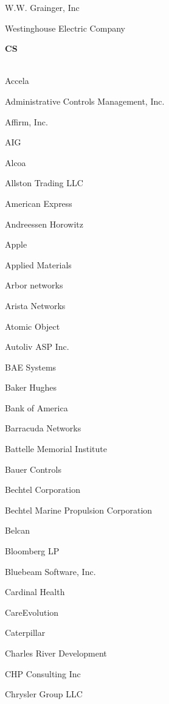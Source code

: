 \documentclass[twoside]{article}
\begin{document}
\begin{center}
\begin{multicols}{5}
\begin{FlushLeft}
\begin{compactitem}
\item W.W. Grainger, Inc
\item Westinghouse Electric Company
\end{compactitem}
        \end{FlushLeft}
        \vspace{1em}
        {\fontsize{14}{16}\selectfont \bf CS}\\
        \vspace{-1em}
        ~\hrulefill~
        \vspace{-.9em}
        \begin{FlushLeft}
        \begin{compactitem}
        \item Accela
\item Administrative Controls Management, Inc.
\item Affirm, Inc.
\item AIG
\item Alcoa
\item Allston Trading LLC
\item American Express
\item Andreessen Horowitz
\item Apple
\item Applied Materials
\item Arbor networks
\item Arista Networks
\item Atomic Object
\item Autoliv ASP Inc.
\item BAE Systems
\item Baker Hughes
\item Bank of America
\item Barracuda Networks
\item Battelle Memorial Institute
\item Bauer Controls
\item Bechtel Corporation
\item Bechtel Marine Propulsion Corporation
\item Belcan
\item Bloomberg LP
\item Bluebeam Software, Inc.
\item Cardinal Health
\item CareEvolution
\item Caterpillar
\item Charles River Development
\item CHP Consulting Inc
\item Chrysler Group LLC

\end{compactitem}
\end{FlushLeft}
\end{multicols}
\end{center}
\end{document}
